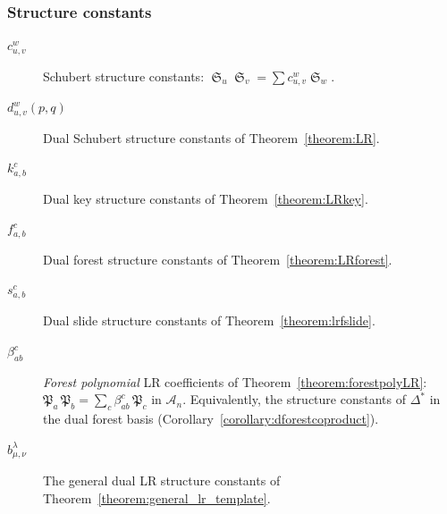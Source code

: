 \documentclass[a4paper,fleqn]{cas-sc}
\theoremstyle{definition}
\theoremstyle{remark}
\numberwithin{equation}{subsection}
\DeclareMathOperator{\sch}{\mathfrak{S}}
\newcommand{\coma}{\mathcal{A}}
\newcommand{\forest}{\mathfrak{P}}
\begin{document}
\subsubsection*{Structure constants}
\begin{description}
\item[$c_{u,v}^w$] Schubert structure constants: $\sch_u\sch_v=\sum c_{u,v}^w\sch_w$.
\item[$d_{u,v}^w(p,q)$] Dual Schubert structure constants of Theorem~\ref{theorem:LR}.
\item[$k_{a,b}^c$] Dual key structure constants of Theorem~\ref{theorem:LRkey}.
\item[$f_{a,b}^c$] Dual forest structure constants of Theorem~\ref{theorem:LRforest}.
\item[$s_{a,b}^c$] Dual slide structure constants of Theorem~\ref{theorem:lrfslide}.
\item[$\beta_{ab}^c$] \emph{Forest polynomial} LR coefficients of Theorem~\ref{theorem:forestpolyLR}: $\forest_a\,\forest_b=\sum_c\beta_{ab}^c\,\forest_c$ in $\coma_n$. Equivalently, the structure constants of $\Delta^*$ in the dual forest basis (Corollary~\ref{corollary:dforestcoproduct}).
\item[$b_{\mu,\nu}^\lambda$] The general dual LR structure constants of Theorem~\ref{theorem:general_lr_template}.
\end{description}
\end{document}
